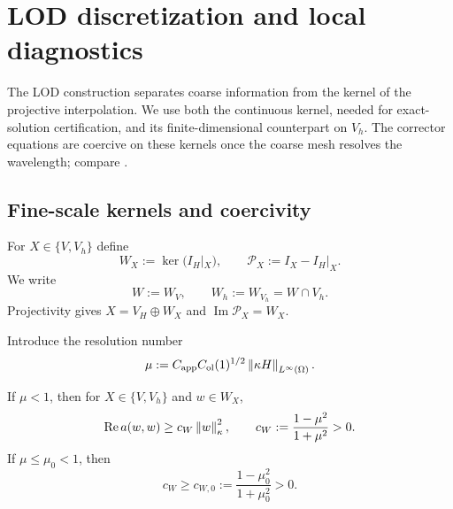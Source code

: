 \section{LOD discretization and local diagnostics}
\label{sec:lod-framework}

The LOD construction separates coarse information from the kernel of the
projective interpolation.  We use both the continuous kernel, needed for
exact-solution certification, and its finite-dimensional counterpart on
$V_h$.  The corrector equations are coercive on these kernels once the
coarse mesh resolves the wavelength; compare
\cite{Peterseim2017,MalqvistPeterseim2020}.

\subsection{Fine-scale kernels and coercivity}
\label{sec:fine-scale-kernel}

For $X\in\{V,V_h\}$ define
\begin{equation}
\label{eq:kernels}
  W_X:=\ker(I_H|_X),
  \qquad
  \mathcal P_X:=I_X-I_H|_X.
\end{equation}
We write
\begin{equation}
\label{eq:continuous-discrete-kernels}
  W:=W_V,
  \qquad
  W_h:=W_{V_h}=W\cap V_h.
\end{equation}
Projectivity gives $X=V_H\oplus W_X$ and
$\operatorname{Im}\mathcal P_X=W_X$.

Introduce the resolution number
\begin{equation}
\label{eq:mu}
  \mu
  :=C_{\mathrm{app}}C_{\mathrm{ol}}(1)^{1/2}
    \left\lVert \kappa H\right\rVert_{L^\infty(\Omega)}.
\end{equation}

\begin{theorem}
\label{thm:kernel-coercivity}
If $\mu<1$, then for $X\in\{V,V_h\}$ and $w\in W_X$,
\begin{equation}
\label{eq:kernel-coercivity}
  \operatorname{Re}a(w,w)
  \geq c_W\left\lVert w\right\rVert_\kappa^2,
  \qquad
  c_W:=\frac{1-\mu^2}{1+\mu^2}>0.
\end{equation}
If $\mu\leq\mu_0<1$, then
\begin{equation}
\label{eq:uniform-kernel-coercivity}
  c_W\geq c_{W,0}
  :=\frac{1-\mu_0^2}{1+\mu_0^2}>0.
\end{equation}
\end{theorem}

